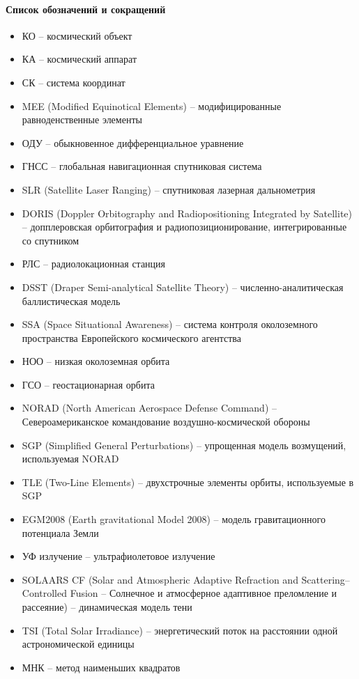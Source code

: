 \paragraph{Список обозначений и сокращений}

\begin{itemize}
    \item КО -- космический объект
    \item КА -- космический аппарат
    \item СК -- система координат
    \item MEE (Modified Equinotical Elements) -- модифицированные равноденственные элементы
    \item ОДУ -- обыкновенное дифференциальное уравнение
    \item ГНСС -- глобальная навигационная спутниковая система
    \item SLR (Satellite Laser Ranging) -- спутниковая лазерная дальнометрия
    \item DORIS (Doppler Orbitography and Radiopositioning Integrated by Satellite) -- допплеровская орбитография и радиопозиционирование, интегрированные со спутником
    \item РЛС -- радиолокационная станция
    \item DSST (Draper Semi-analytical Satellite Theory) -- численно-аналитическая баллистическая модель
    \item SSA (Space Situational Awareness) -- система контроля околоземного пространства Европейского космического агентства
    \item НОО -- низкая околоземная орбита
    \item ГСО -- геостационарная орбита
    \item NORAD (North American Aerospace Defense Command) -- Североамериканское командование воздушно-космической обороны
    \item SGP (Simplified General Perturbations) -- упрощенная модель возмущений, используемая NORAD
    \item TLE (Two-Line Elements) -- двухстрочные элементы орбиты, используемые в SGP
    \item EGM2008 (Earth gravitational Model 2008) -- модель гравитационного потенциала Земли
    \item УФ излучение -- ультрафиолетовое излучение
    \item SOLAARS CF (Solar and Atmospheric Adaptive Refraction and Scattering–Controlled Fusion
    -- Солнечное и атмосферное адаптивное преломление и рассеяние) -- динамическая модель тени
    \item TSI (Total Solar Irradiance) -- энергетический поток на расстоянии одной астрономической единицы
    \item МНК -- метод наименьших квадратов
\end{itemize}

\newpage